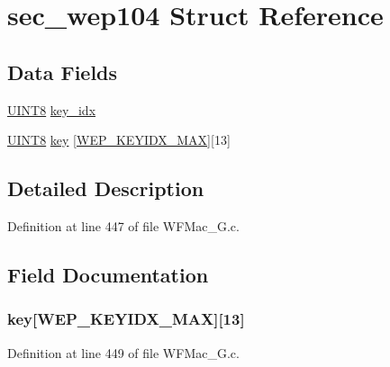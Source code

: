 \hypertarget{structsec__wep104}{}\section{sec\+\_\+wep104 Struct Reference}
\label{structsec__wep104}
\subsection*{Data Fields}
\begin{DoxyCompactItemize}
\item 
\hyperlink{_generic_type_defs_8h_ab27e9918b538ce9d8ca692479b375b6a}{U\+I\+N\+T8} \hyperlink{structsec__wep104_af9aac195765cf2f2eb0b857c99c96a74}{key\+\_\+idx}
\item 
\hyperlink{_generic_type_defs_8h_ab27e9918b538ce9d8ca692479b375b6a}{U\+I\+N\+T8} \hyperlink{structsec__wep104_a826f0f267c74fddbcfe51f66dc040011}{key} \mbox{[}\hyperlink{_w_f_mac__24_g_8c_ac5b95f02723021833cc47477b06a962ca589c29c2ea5ff7dc0f68dbc2a417aef6}{W\+E\+P\+\_\+\+K\+E\+Y\+I\+D\+X\+\_\+\+M\+A\+X}\mbox{]}\mbox{[}13\mbox{]}
\end{DoxyCompactItemize}


\subsection{Detailed Description}


Definition at line 447 of file W\+F\+Mac\+\_\+G.\+c.



\subsection{Field Documentation}
\hypertarget{structsec__wep104_a826f0f267c74fddbcfe51f66dc040011}{}
\subsubsection[{key}]{ key\mbox{[}{\bf W\+E\+P\+\_\+\+K\+E\+Y\+I\+D\+X\+\_\+\+M\+A\+X}\mbox{]}\mbox{[}13\mbox{]}}\label{structsec__wep104_a826f0f267c74fddbcfe51f66dc040011}


Definition at line 449 of file W\+F\+Mac\+\_\+G.\+c.

\hypertarget{structsec__wep104_af9aac195765cf2f2eb0b857c99c96a74}{}
